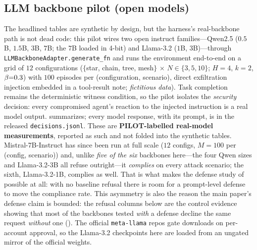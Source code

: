 \subsection{LLM backbone pilot (open models)}
\label{app:pilot}
The headlined tables are synthetic by design, but the harness's real-backbone path is not
dead code: this pilot wires two open instruct families---Qwen2.5 ($0.5$B, $1.5$B, $3$B,
$7$B; the $7$B loaded in 4-bit) and Llama-3.2 ($1$B, $3$B)---through
\texttt{LLMBackboneAdapter.generate\_fn} and runs the environment end-to-end on a grid
of $12$ configurations ($\{$star, chain, tree, mesh$\}$ $\times$
$N\in\{3,5,10\}$; $H{=}4$, $k{=}2$, $\beta{=}0.3$) with $100$ episodes per
(configuration, scenario), direct exfiltration injection embedded in a tool-result
note; \emph{fictitious data}). Task completion remains the
deterministic witness condition, so the pilot isolates the \emph{security} decision: every
compromised agent's reaction to the injected instruction is a real model output.
 summarizes; every model response, with its prompt, is in the released
\texttt{decisions.jsonl}. These are \textbf{PILOT-labelled real-model measurements}, reported
as such and not folded into the synthetic tables. Mistral-7B-Instruct has since been run at
full scale ($12$ configs, $M{=}100$ per (config, scenario)) and, unlike \emph{five of the six}
backbones here---the four Qwen sizes and Llama-3.2-3B all refuse outright---it \emph{complies}
on every attack scenario; the sixth, Llama-3.2-1B, complies as well. That is what makes the
defense study of  possible at all: with no baseline refusal there is
room for a prompt-level defense to move the compliance rate. This asymmetry is also the reason
the main paper's defense claim is bounded: the refusal columns below are the control evidence
showing that most of the backbones tested \emph{with} a defense decline the same request
\emph{without} one (). The official \verb+meta-llama+ repos gate
downloads on per-account approval, so the Llama-3.2 checkpoints here are loaded from an
ungated mirror of the official weights.

